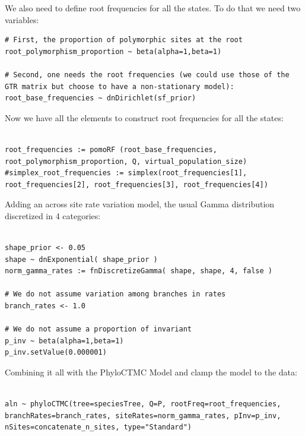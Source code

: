 \documentclass[11pt]{article}
\begin{document}
{\begin{framed}
We also need to define root frequencies for all the states.
To do that we need two variables:

 {\tt \begin{snugshade*}
\begin{lstlisting}
# First, the proportion of polymorphic sites at the root
root_polymorphism_proportion ~ beta(alpha=1,beta=1)

# Second, one needs the root frequencies (we could use those of the GTR matrix but choose to have a non-stationary model):
root_base_frequencies ~ dnDirichlet(sf_prior)
\end{lstlisting}
\end{snugshade*}}

Now we have all the elements to construct root frequencies for all the states:
 {\tt \begin{snugshade*}
\begin{lstlisting}

root_frequencies := pomoRF (root_base_frequencies, root_polymorphism_proportion, Q, virtual_population_size)
#simplex_root_frequencies := simplex(root_frequencies[1], root_frequencies[2], root_frequencies[3], root_frequencies[4])

\end{lstlisting}
\end{snugshade*}}

Adding an across site rate variation model, the usual Gamma distribution discretized in 4 categories:
 {\tt \begin{snugshade*}
\begin{lstlisting}

shape_prior <- 0.05 
shape ~ dnExponential( shape_prior )
norm_gamma_rates := fnDiscretizeGamma( shape, shape, 4, false )

# We do not assume variation among branches in rates
branch_rates <- 1.0

# We do not assume a proportion of invariant
p_inv ~ beta(alpha=1,beta=1)
p_inv.setValue(0.000001)
\end{lstlisting}
\end{snugshade*}}

Combining it all with the PhyloCTMC Model and clamp the model to the data:
 {\tt \begin{snugshade*}
\begin{lstlisting}

aln ~ phyloCTMC(tree=speciesTree, Q=P, rootFreq=root_frequencies, branchRates=branch_rates, siteRates=norm_gamma_rates, pInv=p_inv, nSites=concatenate_n_sites, type="Standard")


\end{lstlisting}
\end{snugshade*}}
\end{framed}}
\end{document}
